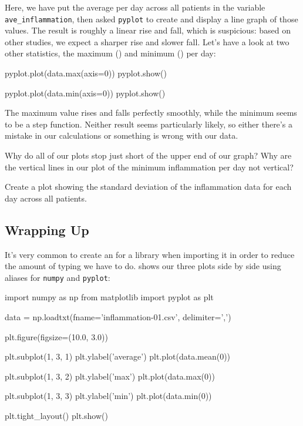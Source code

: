 Here, we have put the average per day across all patients in the
variable \texttt{ave\_inflammation}, then asked \texttt{pyplot} to
create and display a line graph of those values. The result is roughly a
linear rise and fall, which is suspicious: based on other studies, we
expect a sharper rise and slower fall. Let's have a look at two other
statistics, the maximum () and minimum () per day:

\begin{VerbIn}
pyplot.plot(data.max(axis=0))
pyplot.show()

pyplot.plot(data.min(axis=0))
pyplot.show()
\end{VerbIn}



The maximum value rises and falls perfectly smoothly, while the minimum
seems to be a step function. Neither result seems particularly likely,
so either there's a mistake in our calculations or something is wrong
with our data.

\begin{challenge}
  Why do all of our plots stop just short of the upper end of our graph?
  Why are the vertical lines in our plot of the minimum inflammation per
  day not vertical?
\end{challenge}

\begin{challenge}
  Create a plot showing the standard deviation of the inflammation data
  for each day across all patients.
\end{challenge}

\subsection{Wrapping Up}

It's very common to create an  for a
library when importing it in order to reduce the amount of typing we
have to do.  shows our three plots
side by side using aliases for \texttt{numpy} and \texttt{pyplot}:

\begin{VerbIn}
import numpy as np
from matplotlib import pyplot as plt

data = np.loadtxt(fname='inflammation-01.csv', delimiter=',')

plt.figure(figsize=(10.0, 3.0))

plt.subplot(1, 3, 1)
plt.ylabel('average')
plt.plot(data.mean(0))

plt.subplot(1, 3, 2)
plt.ylabel('max')
plt.plot(data.max(0))

plt.subplot(1, 3, 3)
plt.ylabel('min')
plt.plot(data.min(0))

plt.tight_layout()
plt.show()
\end{VerbIn}

